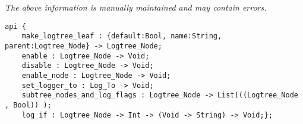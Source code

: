 \label{api:Logger}

{\tiny \it The above information is manually maintained and may contain errors.}
\begin{verbatim}
api {
    make_logtree_leaf : {default:Bool, name:String, parent:Logtree_Node} -> Logtree_Node;
    enable : Logtree_Node -> Void;
    disable : Logtree_Node -> Void;
    enable_node : Logtree_Node -> Void;
    set_logger_to : Log_To -> Void;
    subtree_nodes_and_log_flags : Logtree_Node -> List(((Logtree_Node , Bool)) );
    log_if : Logtree_Node -> Int -> (Void -> String) -> Void;};
\end{verbatim}
